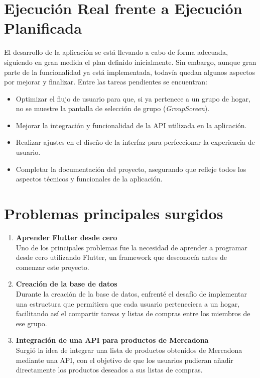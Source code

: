 \documentclass{article}
\begin{document}
\section{Ejecución Real frente a Ejecución Planificada}

El desarrollo de la aplicación se está llevando a cabo de forma adecuada, siguiendo en gran medida el plan definido inicialmente. Sin embargo, aunque gran parte de la funcionalidad ya está implementada, todavía quedan algunos aspectos por mejorar y finalizar. Entre las tareas pendientes se encuentran:

\begin{itemize}
    \item Optimizar el flujo de usuario para que, si ya pertenece a un grupo de hogar, no se muestre la pantalla de selección de grupo (\textit{GroupScreen}).
    \item Mejorar la integración y funcionalidad de la API utilizada en la aplicación.
    \item Realizar ajustes en el diseño de la interfaz para perfeccionar la experiencia de usuario.
    \item Completar la documentación del proyecto, asegurando que refleje todos los aspectos técnicos y funcionales de la aplicación.
\end{itemize}
\section{Problemas principales  surgidos}

\begin{enumerate}
    \item \textbf{Aprender Flutter desde cero} \\
    Uno de los principales problemas fue la necesidad de aprender a programar desde cero utilizando Flutter, un framework que desconocía antes de comenzar este proyecto.

    \item \textbf{Creación de la base de datos} \\
    Durante la creación de la base de datos, enfrenté el desafío de implementar una estructura que permitiera que cada usuario perteneciera a un hogar, facilitando así el compartir tareas y listas de compras entre los miembros de ese grupo.

    \item \textbf{Integración de una API para productos de Mercadona} \\
    Surgió la idea de integrar una lista de productos obtenidos de Mercadona mediante una API, con el objetivo de que los usuarios pudieran añadir directamente los productos deseados a sus listas de compras.
\end{enumerate}

\end{document}
